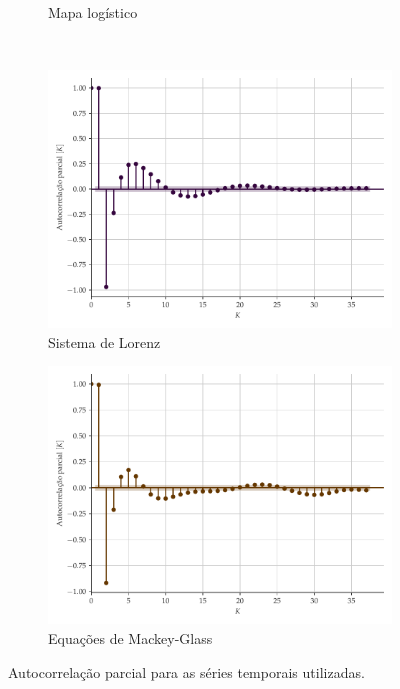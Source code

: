 \documentclass[a4paper, 12pt]{article}
\begin{document}
\begin{figure}[H]
\begin{subfigure}[t]{0.4\textwidth}
         \caption{Mapa logístico}
     \end{subfigure}
     \centering
     \\
     \begin{subfigure}[t]{0.4\textwidth}
         \includegraphics[scale=0.35]{autocorrelacao-parcial-lorenz.pdf}
         \caption{Sistema de Lorenz}
     \end{subfigure}
     \centering
     \begin{subfigure}[t]{0.4\textwidth} 
         \includegraphics[scale=0.35]{autocorrelacao-parcial-mackeyglass.pdf}
         \caption{Equações de Mackey-Glass}
     \end{subfigure}  
     \centering   
     \caption{Autocorrelação parcial para as séries temporais utilizadas.}
     \label{fig:autocorrelation}
\end{figure}
\end{document}
